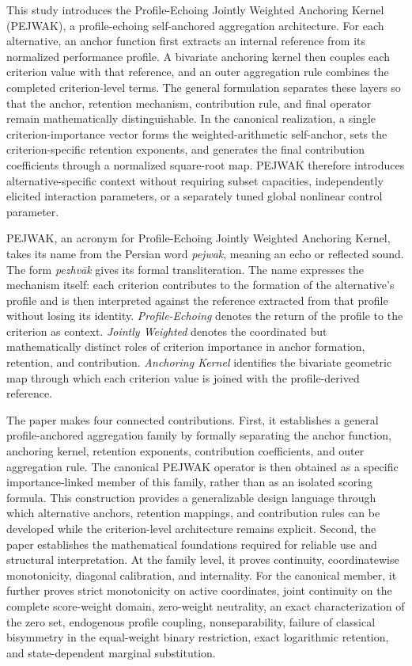 \documentclass[reqno,11pt]{amsart}
\theoremstyle{definition}
\theoremstyle{plain}
\theoremstyle{remark}
\begin{document}
This study introduces the Profile-Echoing Jointly Weighted Anchoring
Kernel (PEJWAK), a profile-echoing self-anchored aggregation architecture.
For each alternative, an anchor function first extracts an internal
reference from its normalized performance profile. A bivariate anchoring
kernel then couples each criterion value with that reference, and an
outer aggregation rule combines the completed criterion-level terms.
The general formulation separates these layers so that the anchor,
retention mechanism, contribution rule, and final operator remain
mathematically distinguishable. In the canonical realization, a single
criterion-importance vector forms the weighted-arithmetic self-anchor,
sets the criterion-specific retention exponents, and generates the final
contribution coefficients through a normalized square-root map. PEJWAK
therefore introduces alternative-specific context without requiring
subset capacities, independently elicited interaction parameters, or a
separately tuned global nonlinear control parameter.

PEJWAK, an acronym for Profile-Echoing Jointly Weighted Anchoring Kernel,
takes its name from the Persian word \textit{pejwak}, meaning an echo or
reflected sound. The form \textit{pezhvāk} gives its formal transliteration. The name expresses the mechanism itself: each
criterion contributes to the formation of the alternative's profile and
is then interpreted against the reference extracted from that profile
without losing its identity. \textit{Profile-Echoing} denotes the return
of the profile to the criterion as context. \textit{Jointly Weighted}
denotes the coordinated but mathematically distinct roles of criterion
importance in anchor formation, retention, and contribution.
\textit{Anchoring Kernel} identifies the bivariate geometric map through
which each criterion value is joined with the profile-derived reference.

The paper makes four connected contributions. First, it establishes a
general profile-anchored aggregation family by formally separating the
anchor function, anchoring kernel, retention exponents, contribution
coefficients, and outer aggregation rule. The canonical PEJWAK operator
is then obtained as a specific importance-linked member of this family,
rather than as an isolated scoring formula. This construction provides a
generalizable design language through which alternative anchors,
retention mappings, and contribution rules can be developed while the
criterion-level architecture remains explicit. Second, the paper
establishes the mathematical foundations required for reliable use and
structural interpretation. At the family level, it proves continuity,
coordinatewise monotonicity, diagonal calibration, and internality. For
the canonical member, it further proves strict monotonicity on active
coordinates, joint continuity on the complete score-weight domain,
zero-weight neutrality, an exact characterization of the zero set,
endogenous profile coupling, nonseparability, failure of classical
bisymmetry in the equal-weight binary restriction, exact logarithmic
retention, and state-dependent marginal substitution.
\end{document}
